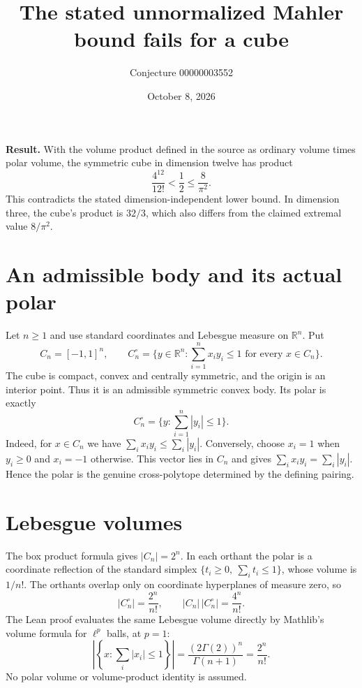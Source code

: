 \documentclass[11pt]{article}
\title{The stated unnormalized Mahler bound fails for a cube}
\author{Conjecture 00000003552}
\date{October 8, 2026}
\begin{document}
\maketitle
\noindent\textbf{Result.} With the volume product defined in the source as ordinary volume times polar volume, the symmetric cube in dimension twelve has product
\[
 \frac{4^{12}}{12!}<\frac12\leq\frac{8}{\pi^2}.
\]
This contradicts the stated dimension-independent lower bound. In dimension three, the cube's product is $32/3$, which also differs from the claimed extremal value $8/\pi^2$.

\section*{An admissible body and its actual polar}
Let $n\geq1$ and use standard coordinates and Lebesgue measure on $\mathbb R^n$. Put
\[
 C_n=[-1,1]^n,\qquad
 C_n^\circ=\{y\in\mathbb R^n:\textstyle\sum_{i=1}^n x_i y_i\leq1
                       \text{ for every }x\in C_n\}.
\]
The cube is compact, convex and centrally symmetric, and the origin is an interior point. Thus it is an admissible symmetric convex body. Its polar is exactly
\[
 C_n^\circ=\{y:\textstyle\sum_{i=1}^n|y_i|\leq1\}.
\]
Indeed, for $x\in C_n$ we have $\sum_i x_i y_i\leq\sum_i|y_i|$. Conversely, choose $x_i=1$ when $y_i\geq0$ and $x_i=-1$ otherwise. This vector lies in $C_n$ and gives $\sum_i x_i y_i=\sum_i|y_i|$. Hence the polar is the genuine cross-polytope determined by the defining pairing.

\section*{Lebesgue volumes}
The box product formula gives $|C_n|=2^n$. In each orthant the polar is a coordinate reflection of the standard simplex $\{t_i\geq0,\ \sum_i t_i\leq1\}$, whose volume is $1/n!$. The orthants overlap only on coordinate hyperplanes of measure zero, so
\[
 |C_n^\circ|=\frac{2^n}{n!},\qquad
 |C_n|\,|C_n^\circ|=\frac{4^n}{n!}.
\]
The Lean proof evaluates the same Lebesgue volume directly by Mathlib's volume formula for $\ell^p$ balls, at $p=1$:
\[
 \left|\left\{x:\sum_i |x_i|\leq1\right\}\right|
 =\frac{(2\Gamma(2))^n}{\Gamma(n+1)}=\frac{2^n}{n!}.
\]
No polar volume or volume-product identity is assumed.

\newpage
\end{document}
